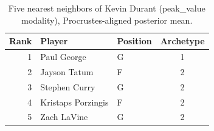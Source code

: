 \begin{table}[htbp]
  \centering\small
  \begin{tabular}{rllc}
    \toprule
    Rank & Player & Position & Archetype \\
    \midrule
    1 & Paul George & G & 1 \\
    2 & Jayson Tatum & F & 2 \\
    3 & Stephen Curry & G & 2 \\
    4 & Kristaps Porzingis & F & 2 \\
    5 & Zach LaVine & G & 2 \\
    \bottomrule
  \end{tabular}
  \caption{Five nearest neighbors of Kevin Durant (peak_value modality), Procrustes-aligned posterior mean.}
  \label{tab:Kevin_Durant_neighbors_peak_value}
\end{table}

